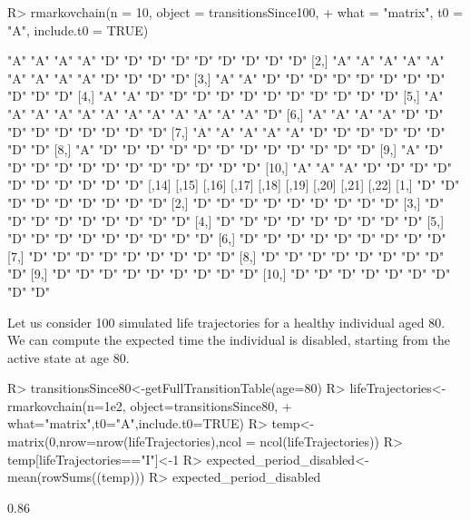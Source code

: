 \documentclass[
  nojss]{jss}
\begin{document}
\begin{CodeChunk}
\begin{CodeInput}
R> rmarkovchain(n = 10, object = transitionsSince100,
+              what = "matrix", t0 = "A", include.t0 = TRUE)
\end{CodeInput}
\begin{CodeOutput}
      [,1] [,2] [,3] [,4] [,5] [,6] [,7] [,8] [,9] [,10] [,11] [,12] [,13]
 [1,] "A"  "A"  "A"  "A"  "D"  "D"  "D"  "D"  "D"  "D"   "D"   "D"   "D"  
 [2,] "A"  "A"  "A"  "A"  "A"  "A"  "A"  "A"  "A"  "D"   "D"   "D"   "D"  
 [3,] "A"  "A"  "D"  "D"  "D"  "D"  "D"  "D"  "D"  "D"   "D"   "D"   "D"  
 [4,] "A"  "A"  "D"  "D"  "D"  "D"  "D"  "D"  "D"  "D"   "D"   "D"   "D"  
 [5,] "A"  "A"  "A"  "A"  "A"  "A"  "A"  "A"  "A"  "A"   "A"   "A"   "D"  
 [6,] "A"  "A"  "A"  "A"  "D"  "D"  "D"  "D"  "D"  "D"   "D"   "D"   "D"  
 [7,] "A"  "A"  "A"  "A"  "A"  "D"  "D"  "D"  "D"  "D"   "D"   "D"   "D"  
 [8,] "A"  "D"  "D"  "D"  "D"  "D"  "D"  "D"  "D"  "D"   "D"   "D"   "D"  
 [9,] "A"  "D"  "D"  "D"  "D"  "D"  "D"  "D"  "D"  "D"   "D"   "D"   "D"  
[10,] "A"  "A"  "A"  "D"  "D"  "D"  "D"  "D"  "D"  "D"   "D"   "D"   "D"  
      [,14] [,15] [,16] [,17] [,18] [,19] [,20] [,21] [,22]
 [1,] "D"   "D"   "D"   "D"   "D"   "D"   "D"   "D"   "D"  
 [2,] "D"   "D"   "D"   "D"   "D"   "D"   "D"   "D"   "D"  
 [3,] "D"   "D"   "D"   "D"   "D"   "D"   "D"   "D"   "D"  
 [4,] "D"   "D"   "D"   "D"   "D"   "D"   "D"   "D"   "D"  
 [5,] "D"   "D"   "D"   "D"   "D"   "D"   "D"   "D"   "D"  
 [6,] "D"   "D"   "D"   "D"   "D"   "D"   "D"   "D"   "D"  
 [7,] "D"   "D"   "D"   "D"   "D"   "D"   "D"   "D"   "D"  
 [8,] "D"   "D"   "D"   "D"   "D"   "D"   "D"   "D"   "D"  
 [9,] "D"   "D"   "D"   "D"   "D"   "D"   "D"   "D"   "D"  
[10,] "D"   "D"   "D"   "D"   "D"   "D"   "D"   "D"   "D"  
\end{CodeOutput}
\end{CodeChunk}

Let us consider 100 simulated life trajectories for a healthy individual aged 80. We can compute the expected time the individual is disabled, starting from the active state at age 80.

\begin{CodeChunk}
\begin{CodeInput}
R> transitionsSince80<-getFullTransitionTable(age=80)
R> lifeTrajectories<-rmarkovchain(n=1e2, object=transitionsSince80,
+                                what="matrix",t0="A",include.t0=TRUE)
R> temp<-matrix(0,nrow=nrow(lifeTrajectories),ncol = ncol(lifeTrajectories))
R> temp[lifeTrajectories=="I"]<-1
R> expected_period_disabled<-mean(rowSums((temp)))
R> expected_period_disabled
\end{CodeInput}
\begin{CodeOutput}
[1] 0.86
\end{CodeOutput}
\end{CodeChunk}
\end{document}
